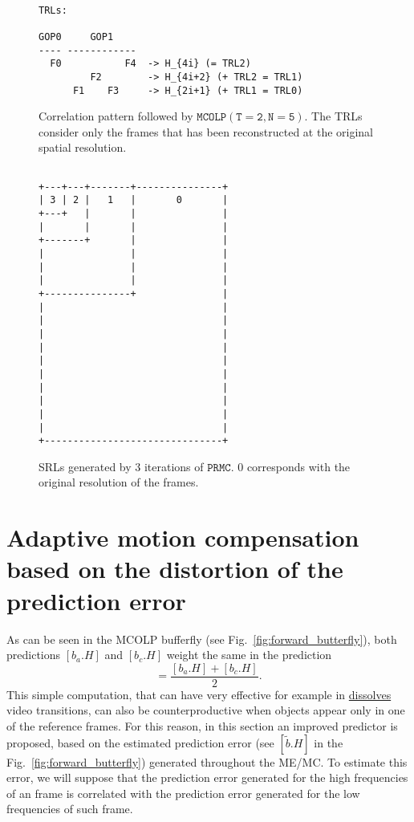 \begin{figure}
\begin{verbatim}

TRLs:

GOP0     GOP1
---- ------------
  F0           F4  -> H_{4i} (= TRL2)
         F2        -> H_{4i+2} (+ TRL2 = TRL1)
      F1    F3     -> H_{2i+1} (+ TRL1 = TRL0)
\end{verbatim}
  \caption{Correlation pattern followed by $\mathtt{MCOLP(T=2,
      N=5)}$. The TRLs consider only the frames that has been
    reconstructed at the original spatial resolution.}
  \label{fig:PRMC_2_5_T}
\end{figure}

\begin{figure}
\begin{verbatim}

+---+---+-------+---------------+
| 3 | 2 |   1   |       0       |
+---+   |       |               |
|       |       |               |
+-------+       |               |
|               |               |
|               |               |
|               |               |
+---------------+               |
|                               |
|                               |
|                               |
|                               |
|                               |
|                               |
|                               |
|                               |
|                               |
|                               |
+-------------------------------+
\end{verbatim}
\caption{SRLs generated by $3$ iterations of $\mathtt{PRMC}$. $0$
    corresponds with the original resolution of the frames.}
  \label{fig:PRMC_2_5_S}
\end{figure}


\section{Adaptive motion compensation based on the distortion of the prediction error}

As can be seen in the MCOLP bufferfly (see
Fig.~\ref{fig:forward_butterfly}), both predictions $[b_a.H]$ and
$[b_c.H]$ weight the same in the prediction
\begin{equation}
  [\hat{b.H}] = \frac{[b_a.H] + [b_c.H]}{2}.
\end{equation}
This simple computation, that can have very effective for example in
\href{https://biteable.com/blog/tips/video-transitions-effects-examples/}{dissolves}
video transitions, can also be counterproductive when objects appear
only in one of the reference frames. For this reason, in this section
an improved predictor is proposed, based on the estimated prediction
error (see $[\tilde{b}.H]$ in the Fig.~\ref{fig:forward_butterfly})
generated throughout the ME/MC. To estimate this error, we will
suppose that the prediction error generated for the high frequencies
of an frame is correlated with the prediction error generated for the
low frequencies of such frame.

